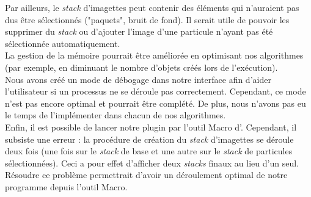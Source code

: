 Par ailleurs, le \textit{stack} d'imagettes peut contenir des éléments qui n'auraient pas dus être sélectionnés ("paquets", bruit de fond). Il serait utile de pouvoir les supprimer du \textit{stack} ou d'ajouter l'image d'une particule n'ayant pas été sélectionnée automatiquement. \\

La gestion de la mémoire pourrait être améliorée en optimisant nos algorithmes (par exemple, en diminuant le nombre d'objets créés lors de l'exécution). \\

Nous avons créé un mode de débogage dans notre interface afin d'aider l'utilisateur si un processus ne se déroule pas correctement. Cependant, ce mode n'est pas encore optimal et pourrait être complété. De plus, nous n'avons pas eu le temps de l'implémenter dans chacun de nos algorithmes. \\

Enfin, il est possible de lancer notre plugin par l'outil Macro d'\imj. Cependant, il subsiste une erreur : la procédure de création du \textit{stack} d'imagettes se déroule deux fois (une fois sur le \textit{stack} de base et une autre sur le \textit{stack} de particules sélectionnées). Ceci a pour effet d'afficher deux \textit{stacks} finaux au lieu d'un seul. Résoudre ce problème permettrait d'avoir un déroulement optimal de notre programme depuis l'outil Macro. 


















